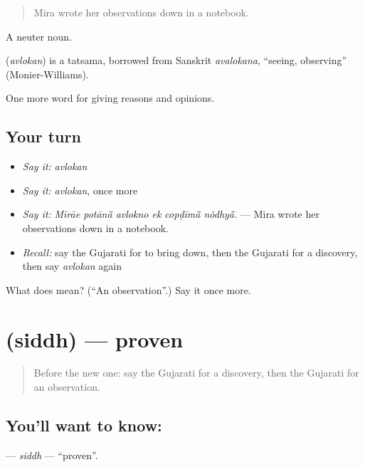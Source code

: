 \begin{quote}
Mira wrote her observations down in a notebook.
\end{quote}

A neuter noun.

\begin{cousinweb}
\textbf{} (\emph{avlokan}) is a tatsama, borrowed from Sanskrit \emph{avalokana}, \textquotedblleft{}seeing, observing\textquotedblright{} (Monier-Williams).
\end{cousinweb}

\begin{grammarlens}[title={What you've built}]
One more word for giving reasons and opinions.
\end{grammarlens}

\subsection*{Your turn}
\begin{itemize}
\raggedright
  \item \emph{Say it:} \emph{avlokan}
  \item \emph{Say it:} \emph{avlokan}, once more
  \item \emph{Say it:} \emph{Mīrāe potānā̃ avlokno ek copḍīmā̃ nõdhyā̃.} — Mira wrote her observations down in a notebook.
  \item \emph{Recall:} say the Gujarati for to bring down, then the Gujarati for a discovery, then say \emph{avlokan} again
\end{itemize}

\begin{tcolorbox}[breakable,colback=teal!4,colframe=teal!35!black,title={Before you move on}]
What does  mean? (\textquotedblleft{}An observation\textquotedblright{}.) Say it once more.
\end{tcolorbox}
\section[\texorpdfstring{\gu{સિદ્ધ} (siddh)}{સિદ્ધ (siddh)}]{ (siddh) — proven}

\label{lesson:GU-C364-siddh}



\begin{quote}
Before the new one: say the Gujarati for a discovery, then the Gujarati for an observation.
\end{quote}

\subsection*{You'll want to know: }
\textbf{} — \emph{siddh} — \textquotedblleft{}proven\textquotedblright{}.

